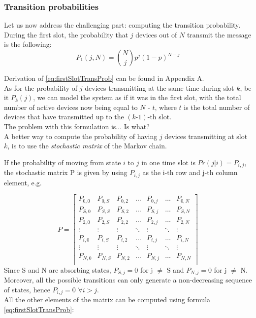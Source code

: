\subsubsection{Transition probabilities}
Let us now address the challenging part: computing the transition probability.
\hfill \break
During the first slot, the probability that $j$ devices out of $N$ transmit the message is the following:
\begin{equation}
	P_{1}(j, N) = {N\choose j} p^{j} (1-p)^{N-j}
	\label{eq:firstSlotTransProb}
\end{equation}

\noindent Derivation of \ref{eq:firstSlotTransProb} can be found in Appendix A.\\

As for the probability of $j$ devices transmitting at the same time during slot $k$, be it $P_{k}(j)$, we can model the system as if it was in the first slot, with the total number of active devices now being equal to $N$ - $t$, where $t$ is the total number of devices that have transmitted up to the $(k\text{-}1)$-th slot.\\
The problem with this formulation is... Is what? \\

A better way to compute the probability of having $j$ devices transmitting at slot $k$, is to use the \textit{stochastic matrix} of the Markov chain.

If the probability of moving from state $i$ to $j$ in one time slot is $Pr(j|i) = P_{i,j}$, the stochastic matrix P is given by using $P_{i,j}$ as the i-th row and j-th column element, e.g.

\begin{equation*}
P = 
\begin{bmatrix}
P_{0,0}	& P_{0,S}	& P_{0,2}	& \dots  	& P_{0,j}	& \dots		& P_{0,N} \\
P_{S,0}	& P_{S,S}	& P_{S,2}	& \dots  	& P_{S,j}	& \dots		& P_{S,N} \\
P_{2,0}	& P_{2,S}	& P_{2,2}	& \dots  	& P_{2,j}	& \dots		& P_{2,N} \\
\vdots	& \vdots	& \vdots	& \ddots 	& \vdots	& \ddots	& \vdots \\
P_{i,0}	& P_{i,S}	& P_{i,2}	& \dots		& P_{i,j}	& \dots		& P_{i,N} \\
\vdots	& \vdots	& \vdots	& \ddots	& \vdots	& \ddots	& \vdots \\
P_{N,0}	& P_{N,S}	& P_{N,2}	& \dots		& P_{N,j}	& \dots		& P_{N,N} \\
\end{bmatrix}
\label{stochasticMatrix1}
\end{equation*}
\hfill \break
Since S and N are absorbing states, $P_{S,j}=0$ for j $\neq$ S and $P_{N,j}=0$ for j $\neq$ N.\\
Moreover, all the possible transitions can only generate a non-decreasing sequence of states, hence $P_{i, j} = 0 $ $ \forall i > j $.\\
All the other elements of the matrix can be computed using formula \ref{eq:firstSlotTransProb}:

